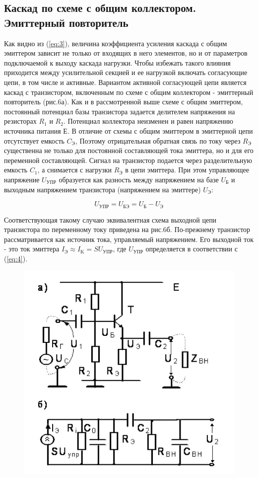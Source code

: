 \subsection{Каскад по схеме с общим коллектором. Эмиттерный повторитель}
Как видно из (\ref{eq:3}), величина коэффициента усиления каскада с общим эмиттером зависит не только от входящих в него элементов, но и от параметров подключаемой к выходу каскада нагрузки. Чтобы избежать такого влияния приходится между усилительной секцией и ее нагрузкой включать согласующие цепи, в том числе и активные. Вариантом активной согласующей цепи является каскад с транзистором, включенным по схеме с общим коллектором - эмиттерный повторитель (рис.6а). Как и в рассмотренной выше схеме с общим эмиттером, постоянный потенциал базы транзистора задается делителем напряжения на резисторах $R_1$ и $R_2$. Потенциал коллектора неизменен и равен напряжению источника питания Е. В отличие от схемы с общим эмиттером в эмиттерной цепи отсутствует емкость $C_{\text{Э}}$, Поэтому отрицательная обратная связь по току через $R_{\text{Э}}$ существенна не только для постоянной составляющей тока эмиттера, но и для его переменной составляющей. Сигнал на транзистор подается через разделительную емкость $C_1$, а снимается с нагрузки $R_{\text{Э}}$ в цепи эмиттера. При этом управляющее напряжение $U_{\text{УПР}}$ образуется как разность между напряжением на базе $U_{\text{Б}}$ и выходным напряжением транзистора (напряжением на эмиттере) $U_{\text{Э}}$:

\begin{equation}
	U_{\text{УПР}}=U_{\text{БЭ}}=U_{\text{Б}}-U_{\text{Э}}
	\label{eq:4}
\end{equation}

Соответствующая такому случаю эквивалентная схема выходной цепи транзистора по переменному току приведена на рис.6б. По-прежнему транзистор рассматривается как источник тока, управляемый напряжением. Его выходной ток - это ток эмиттера $I_{\text{Э}} \approx I_{\text{K}}=SU_{\text{УПР}}$, где $U_{\text{УПР}}$ определяется в соответствии с (\ref{eq:4}).

\begin{figure}[h!]
	\centering
	\includegraphics[width=0.6\linewidth]{fig/fig6}
	\caption{}
	\label{fig:6}
\end{figure}

